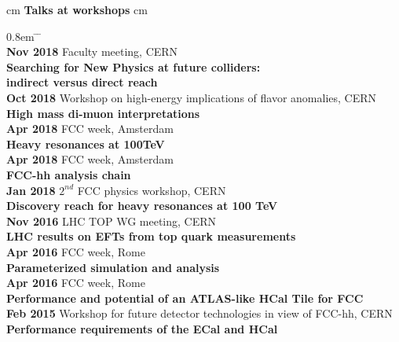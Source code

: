 \documentclass[12pt]{article}
\begin{document}
 cm
{\bf  \large  Talks at workshops}
 cm
\begin{tabbing}
\itemsep0.8em
   \= \hskip  3.3cm  \=  \hskip 7.3cm \=   \\ 
  \> {\bf Nov 2018} \> Faculty meeting, CERN\>  \\
  \> \>  {\bf Searching for New Physics at future colliders:}\>  \\
  \> \>  {\bf indirect versus direct reach} \> \\[0.2cm]

  \> {\bf Oct 2018} \> Workshop on high-energy implications of flavor anomalies, CERN\>  \\
  \> \>  {\bf High mass di-muon interpretations } \>\\[0.2cm]

  \> {\bf Apr 2018} \> FCC week, Amsterdam\>  \\
  \> \>  {\bf Heavy resonances at 100TeV } \>\\[0.2cm]

  \> {\bf Apr 2018} \> FCC week, Amsterdam\>  \\
  \> \>  {\bf FCC-hh analysis chain } \> \\[0.2cm]

  \> {\bf Jan 2018} \> $2^{nd}$ FCC physics workshop, CERN\>  \\
  \> \>  {\bf Discovery reach for heavy resonances at 100 TeV } \>\\[0.2cm]

  \> {\bf Nov 2016} \> LHC TOP WG meeting, CERN\>  \\
  \> \>  {\bf   LHC results on EFTs from top quark measurements} \>\\[0.2cm]

  \> {\bf Apr 2016} \> FCC week, Rome\>  \\
  \> \>  {\bf Parameterized simulation and analysis  } \> \\[0.2cm]

  \> {\bf Apr 2016} \> FCC week, Rome\>  \\
  \> \>  {\bf Performance and potential of an ATLAS-like HCal Tile for FCC } \> \\[0.2cm]

  \> {\bf Feb 2015} \> Workshop for future detector technologies in view of FCC-hh, CERN \>  \\
  \> \>  {\bf Performance requirements of the ECal and HCal} \> \\[0.2cm]
   

\end{tabbing}
\end{document}
